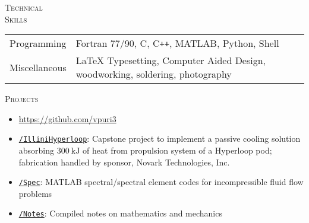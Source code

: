 \documentclass[10pt]{article}
\begin{document}
\vspace{-1.5em}
\begin{multicols}{2}
\textsc{\small Technical \\ Skills}
\columnbreak

\begin {table}[H]
\begin{tabular}{l l }
\hspace{-0.5em}Programming   & \hspace{-0.0em}Fortran 77/90, C, C\texttt{++}, MATLAB, Python, Shell\\
\hspace{-0.5em}Miscellaneous & \hspace{-0.0em}\LaTeX{} Typesetting, Computer Aided Design, woodworking, soldering, photography \\
\end{tabular}	
\end{table}

\vspace{-1.0em}
\end{multicols}
\vspace{-1.5em}
\begin{multicols}{2}
\textsc{\small Projects} %
\columnbreak

\vspace{-2.0em}
\begin{itemize}[label=-]
    \setlength{\itemindent}{-1.5em}
    \setlength\itemsep{-0.25\itemsep}
    \item[] \url{https://github.com/vpuri3}
    \item \href{https://github.com/vpuri3/IlliniHyperloop}{\texttt{/IlliniHyperloop}}: Capstone project to implement a passive cooling solution absorbing $\SI{300}{\kilo \joule}$ of heat from propulsion system of a Hyperloop pod; fabrication handled by sponsor, Novark Technologies, Inc.
    \item \href{https://github.com/vpuri3/Spec}{\texttt{/Spec}}: MATLAB spectral/spectral element codes for incompressible fluid flow problems
    \item \href{https://github.com/vpuri3/Notes}{\texttt{/Notes}}: Compiled notes on mathematics and mechanics
\end{itemize}
\vspace{-2.0em}

\end{multicols}
\vspace{-1.5em}
\vfill
\end{document}

